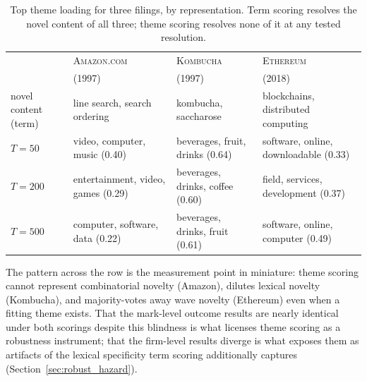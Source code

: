 \begin{table}[h]\centering\small
\caption{Top theme loading for three filings, by representation. Term
scoring resolves the novel content of all three; theme scoring resolves
none of it at any tested resolution.}
\label{tab:exhibit}
\begin{tabular}{lp{3.1cm}p{3.1cm}p{3.1cm}}
\toprule
& \textsc{Amazon.com} & \textsc{Kombucha} & \textsc{Ethereum} \\
& (1997) & (1997) & (2018) \\
\midrule
novel content (term) & line search, search ordering & kombucha, saccharose & blockchains, distributed computing \\
$T=50$ & video, computer, music (0.40) & beverages, fruit, drinks (0.64) & software, online, downloadable (0.33) \\
$T=200$ & entertainment, video, games (0.29) & beverages, drinks, coffee (0.60) & field, services, development (0.37) \\
$T=500$ & computer, software, data (0.22) & beverages, drinks, fruit (0.61) & software, online, computer (0.49) \\
\bottomrule
\end{tabular}
\end{table}

The pattern across the row is the measurement point in miniature: theme
scoring cannot represent combinatorial novelty (Amazon), dilutes lexical
novelty (Kombucha), and majority-votes away wave novelty (Ethereum) even
when a fitting theme exists. That the mark-level outcome results are
nearly identical under both scorings despite this blindness is what
licenses theme scoring as a robustness instrument; that the firm-level
results diverge is what exposes them as artifacts of the lexical
specificity term scoring additionally captures
(Section~\ref{sec:robust_hazard}).

